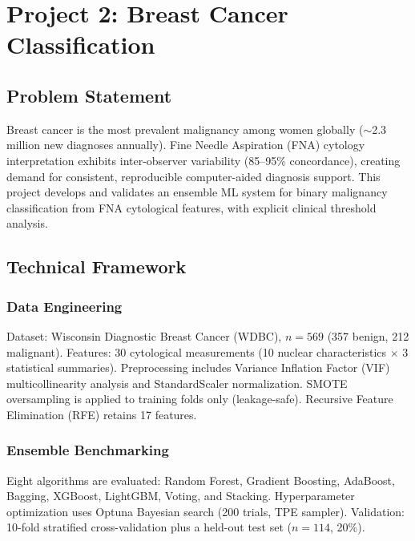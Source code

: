 \documentclass[11pt,a4paper]{article}
\begin{document}
\section{Project 2: Breast Cancer Classification}

\subsection{Problem Statement}

Breast cancer is the most prevalent malignancy among women globally ($\sim$2.3 million new diagnoses annually). Fine Needle Aspiration (FNA) cytology interpretation exhibits inter-observer variability (85--95\% concordance), creating demand for consistent, reproducible computer-aided diagnosis support. This project develops and validates an ensemble ML system for binary malignancy classification from FNA cytological features, with explicit clinical threshold analysis.

\subsection{Technical Framework}

\subsubsection{Data Engineering}

Dataset: Wisconsin Diagnostic Breast Cancer (WDBC), $n = 569$ (357 benign, 212 malignant). Features: 30 cytological measurements (10 nuclear characteristics $\times$ 3 statistical summaries). Preprocessing includes Variance Inflation Factor (VIF) multicollinearity analysis and StandardScaler normalization. SMOTE oversampling is applied to training folds only (leakage-safe). Recursive Feature Elimination (RFE) retains 17 features.

\subsubsection{Ensemble Benchmarking}

Eight algorithms are evaluated: Random Forest, Gradient Boosting, AdaBoost, Bagging, XGBoost, LightGBM, Voting, and Stacking. Hyperparameter optimization uses Optuna Bayesian search (200 trials, TPE sampler). Validation: 10-fold stratified cross-validation plus a held-out test set ($n = 114$, 20\%).
\end{document}
